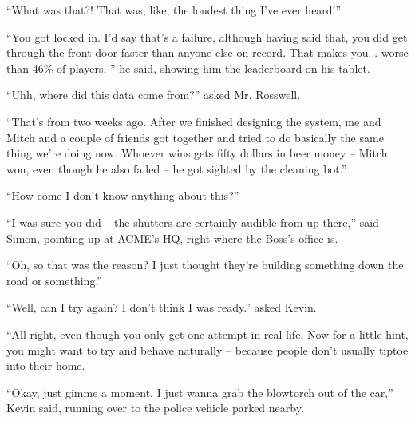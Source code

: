 \documentclass[10pt,a4paper]{article}
\newcommand{\lang}[2]{ #2 \par}
\newcommand{\mainname}{Simon}
\newcommand{\auxname}{Mitch}
\newcommand{\corpnameshort}{ACME}
\newcommand{\ceoname}{Mr. Rosswell}
\newcommand{\criminalname}{Kevin}
\begin{document}
\lang{-- Что это было?! Это был самый громкий звук, что я слышал!}{``What was that?! That was, like, the loudest thing I've ever heard!''}
\lang{-- Тебя заперли. Я бы сказал, что это неудача, но зато ты прошел дверь быстрее всех игроков. Поэтому ты... ниже 46\% игроков, -- он сказал, показывая таблицу результатов на планшете.}{``You got locked in. I'd say that's a failure, although having said that, you did get through the front door faster than anyone else on record. That makes you... worse than 46\% of players, '' he said, showing him the leaderboard on his tablet.}
\lang{-- Эээ, а эти данные откуда? -- спросил \ceoname{}.}{``Uhh, where did this data come from?'' asked \ceoname{}.}
\lang{-- Это было две недели назад. После того, как мы разработали систему, я и 
 \auxname{} и ещё пара друзей собрались и попытались заниматься тем же самым, чем сейчас. Тот, кто побеждает, получает три тысячи рублей на пиво. \auxname{} выиграл, хоть он и тоже потерпел поражение -- его заметил робот-пылесос.}{``That's from two weeks ago. After we finished designing the system, me and \auxname{} and a couple of friends got together and tried to do basically the same thing we're doing now. Whoever wins gets fifty dollars in beer money -- \auxname{} won, even though he also failed -- he got sighted by the cleaning bot.''}
\lang{-- А почему это я ничего не знаю про это?}{``How come I don't know anything about this?''}
\lang{-- Я был уверен, что знаете. Эти ставни оттуда точно слышны,-- сказал \mainname{}, указывая на здание \corpnameshort{}, где находится офис \ceoname{}.}{``I was sure you did -- the shutters are certainly audible from up there,'' said \mainname{}, pointing up at \corpnameshort{}'s HQ, right where the Boss's office is.}
\lang{-- Ах, так это было из-за этого? Я просто думал, что там стройка какая-то или чего-то.}{``Oh, so that was the reason? I just thought they're building something down the road or something.''}
\lang{-- Ну так можно попробовать ещё? Мне кажется, я не был готов, -- спросил \criminalname{}.}{``Well, can I try again? I don't think I was ready.'' asked \criminalname{}.}
\lang{-- Хорошо, хотя в реальной жизни только одна попытка. Вот тогда тебе подсказка: попробуй вести себя поестественнее. Люди обыкнрвенно не крадутся к себе домой.}{``All right, even though you only get one attempt in real life. Now for a little hint, you might want to try and behave naturally -- because people don't usually tiptoe into their home.}
\lang{-- Окей, давай-ка я быстро сбегаю и схвачу газовый резак, -- \criminalname{} сказал, подбегая к полицейской машине, припаркованной рядом.}{``Okay, just gimme a moment, I just wanna grab the blowtorch out of the car,'' \criminalname{} said, running over to the police vehicle parked nearby.}
\end{document}
